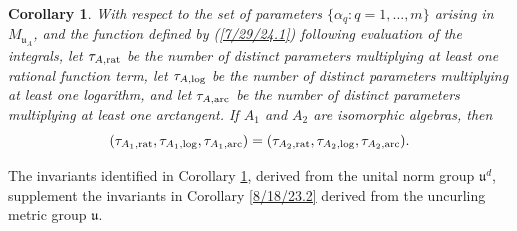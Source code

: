 \documentclass{amsart}
\numberwithin{equation}{section}
\newtheorem{corollary}[theorem]{Corollary}
\theoremstyle{definition}
\numberwithin{theorem}{section}
\begin{document}
\begin{corollary}\label{7/25/24.1} With respect to the set of parameters $\{\alpha_q:q=1,\dots,m\}$ arising in $M_{\mathfrak{u}_A}$, and the function defined by (\ref{7/29/24.1}) following evaluation of the integrals, let $\tau_{A,{\rm rat}}$ be the number of distinct parameters multiplying at least one rational function term, let $\tau_{A,{\rm log}}$ be the number of distinct parameters multiplying at least one logarithm, and let $\tau_{A,{\rm arc}}$ be the number of distinct parameters multiplying at least one arctangent.  If $A_1$ and $A_2$ are isomorphic algebras, then \[ (\tau_{A_1,{\rm rat}},\tau_{A_1,{\rm log}},\tau_{A_1,{\rm arc}}) = (\tau_{A_2,{\rm rat}},\tau_{A_2,{\rm log}},\tau_{A_2,{\rm arc}}).\]
\end{corollary}

The invariants identified in Corollary \ref{7/25/24.1}, derived from the unital norm group $\mathfrak{u}^d$, supplement the invariants in Corollary \ref{8/18/23.2} derived from the uncurling metric group $\mathfrak{u}$.


\bigskip
\end{document}
